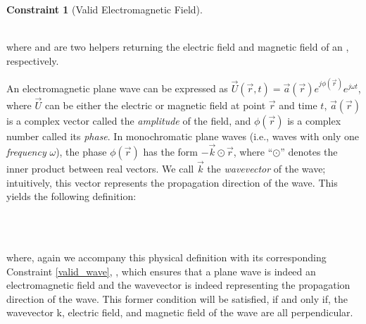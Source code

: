 \documentclass{llncs}
\newtheorem{cons}{Constraint}
\begin{document}
{\begin{cons}[Valid Electromagnetic Field]\  \\
\\
\end{cons}
 \noindent where  and  are two helpers returning the electric field and magnetic field of an , respectively. 
 	

An electromagnetic plane wave can be expressed as
$\vec{U}(\vec{r},t) = \vec a(\vec{r}) e^{j\phi(\vec{r})} e^{j\omega t}$,
where $\vec{U}$ can be either the electric or magnetic field at point $\vec{r}$ and time $t$,
$\vec a(\vec{r})$ is a complex vector called the \emph{amplitude} of the field,
and $\phi (\vec{r})$ is a complex number called its \emph{phase}.
In monochromatic plane waves (i.e., waves with only one \emph{frequency} $\omega$), the phase $\phi(\vec{r})$ has the form $-\vec{k} \odot \vec{r}$,
where ``$\odot$'' denotes the inner product between real vectors.
We call $\vec k$ the \emph{wavevector} of the wave; intuitively, this vector represents the propagation direction of the wave.
This yields the following definition:
\begin{definition} 
 \label{def_planar}\ \vspace{.1cm}\ \\
\ \vspace{.1cm}\\
\end{definition}

\noindent where, again we accompany this physical definition with its corresponding Constraint \ref{valid_wave}, , which ensures that a plane wave  is indeed an electromagnetic field and the wavevector is indeed representing the propagation direction of the wave. This former condition will be satisfied, if and only if, the wavevector \hol k, electric field, and magnetic field of the wave are all perpendicular.  

}
\end{document}
